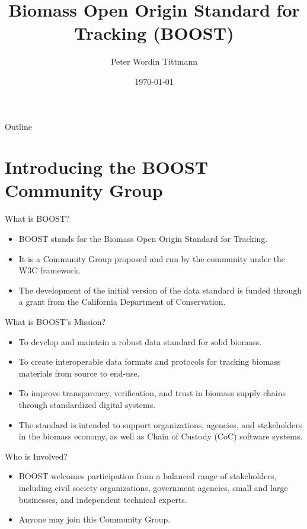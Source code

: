 \documentclass[presentation]{beamer}
\author{Peter Wordin Tittmann}
\date{\today}
\title{Biomass Open Origin Standard for Tracking (BOOST)}
\begin{document}
\begin{frame}{Outline}
\tableofcontents
\end{frame}

\maketitle
\section{Introducing the BOOST Community Group}
\label{introducing-the-boost-community-group}
\begin{frame}[label={sec:org826eb60}]{What is BOOST?}
\begin{itemize}
\item BOOST stands for the Biomass Open Origin Standard for Tracking.
\item It is a Community Group proposed and run by the community under the W3C framework.
\item The development of the initial version of the data standard is funded through a grant from the California Department of Conservation.
\end{itemize}
\end{frame}
\begin{frame}[label={sec:org54f85f6}]{What is BOOST's Mission?}
\begin{itemize}
\item To develop and maintain a robust data standard for solid biomass.
\item To create interoperable data formats and protocols for tracking biomass materials from source to end-use.
\item To improve transparency, verification, and trust in biomass supply chains through standardized digital systems.
\item The standard is intended to support organizations, agencies, and stakeholders in the biomass economy, as well as Chain of Custody (CoC) software systems.
\end{itemize}
\end{frame}
\begin{frame}[label={sec:org875ba66}]{Who is Involved?}
\begin{itemize}
\item BOOST welcomes participation from a balanced range of stakeholders, including civil society organizations, government agencies, small and large businesses, and independent technical experts.
\item Anyone may join this Community Group.
\end{itemize}
\end{frame}
\end{document}
